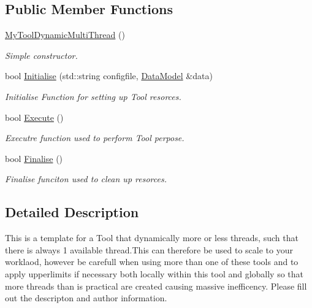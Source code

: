 \subsection*{Public Member Functions}
\begin{DoxyCompactItemize}
\item 
\hypertarget{classMyToolDynamicMultiThread_a5eec7239400c507754ba6218b3eb8d4a}{\hyperlink{classMyToolDynamicMultiThread_a5eec7239400c507754ba6218b3eb8d4a}{My\-Tool\-Dynamic\-Multi\-Thread} ()}\label{classMyToolDynamicMultiThread_a5eec7239400c507754ba6218b3eb8d4a}

\begin{DoxyCompactList}\small\item\em Simple constructor. \end{DoxyCompactList}\item 
bool \hyperlink{classMyToolDynamicMultiThread_ac082408d85bc3e76214e55d4f62de0da}{Initialise} (std\-::string configfile, \hyperlink{classDataModel}{Data\-Model} \&data)
\begin{DoxyCompactList}\small\item\em Initialise Function for setting up Tool resorces. \end{DoxyCompactList}\item 
\hypertarget{classMyToolDynamicMultiThread_aec2f9af9495520d74bb154d626a94a63}{bool \hyperlink{classMyToolDynamicMultiThread_aec2f9af9495520d74bb154d626a94a63}{Execute} ()}\label{classMyToolDynamicMultiThread_aec2f9af9495520d74bb154d626a94a63}

\begin{DoxyCompactList}\small\item\em Executre function used to perform Tool perpose. \end{DoxyCompactList}\item 
\hypertarget{classMyToolDynamicMultiThread_ab70e77b0fd90e50c5103ccfa0bfd6485}{bool \hyperlink{classMyToolDynamicMultiThread_ab70e77b0fd90e50c5103ccfa0bfd6485}{Finalise} ()}\label{classMyToolDynamicMultiThread_ab70e77b0fd90e50c5103ccfa0bfd6485}

\begin{DoxyCompactList}\small\item\em Finalise funciton used to clean up resorces. \end{DoxyCompactList}\end{DoxyCompactItemize}


\subsection{Detailed Description}
This is a template for a Tool that dynamically more or less threads, such that there is always 1 available thread.\-This can therefore be used to scale to your worklaod, however be carefull when using more than one of these tools and to apply upperlimits if necessary both locally within this tool and globally so that more threads than is practical are created causing massive inefficency. Please fill out the descripton and author information.

